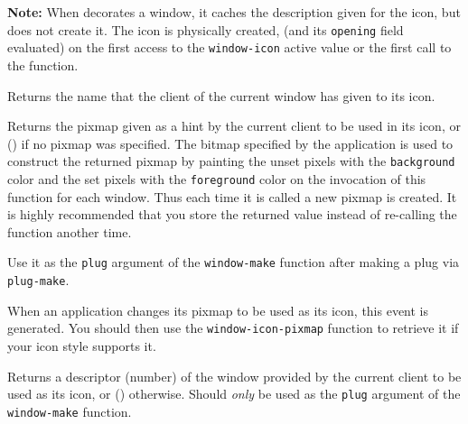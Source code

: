 {\bf Note:} When {\GWM} decorates a window, it caches the {\WOOL}
description given for the icon, but does not create it. The icon is
physically created, (and its \verb"opening" field evaluated) on the first
access to the \verb"window-icon" active value or the first call to the
 function.

        

Returns the name that the client of the current window has given to its icon.

        

Returns the pixmap given as a hint by the current client to be used in its
icon, or () if no pixmap was specified. The bitmap specified by the
application is used to construct the returned pixmap by painting the unset
pixels with the \verb"background" color and the set pixels with the
\verb"foreground" color on the invocation of this function for each window.
Thus each time it is called a new pixmap is created. It is highly
recommended that you store the returned value instead of re-calling the
function another time.

Use it as the \verb"plug" argument of the \verb"window-make" function after
making a plug via \verb"plug-make".

        

When an application changes its pixmap to be used as its icon, this event is
generated. You should then use the \verb"window-icon-pixmap" function to
retrieve it if your icon style supports it.

        

Returns a descriptor (number) of the window provided by the current client
to be used as its icon, or () otherwise. Should {\em only} be used as the
\verb"plug" argument of the \verb"window-make" function.

        

